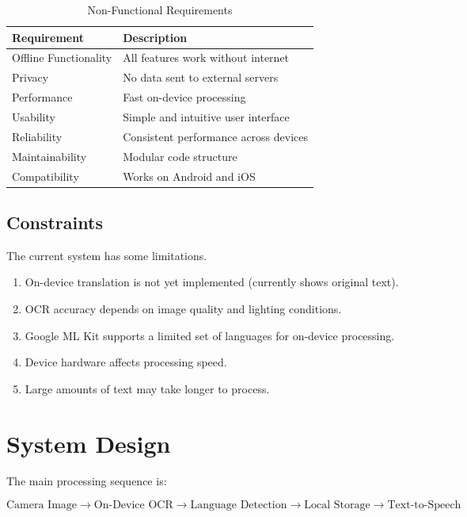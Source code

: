 \documentclass[12pt,a4paper]{report}
\begin{document}
\begin{table}[H]
\centering
\caption{Non-Functional Requirements}
\begin{tabular}{|p{4cm}|p{7cm}|}
\hline
\textbf{Requirement} & \textbf{Description} \\ \hline
Offline Functionality & All features work without internet \\ \hline
Privacy & No data sent to external servers \\ \hline
Performance & Fast on-device processing \\ \hline
Usability & Simple and intuitive user interface \\ \hline
Reliability & Consistent performance across devices \\ \hline
Maintainability & Modular code structure \\ \hline
Compatibility & Works on Android and iOS \\ \hline
\end{tabular}
\end{table}

\subsection{Constraints}

The current system has some limitations.

\begin{enumerate}
    \item On-device translation is not yet implemented (currently shows original text).
    \item OCR accuracy depends on image quality and lighting conditions.
    \item Google ML Kit supports a limited set of languages for on-device processing.
    \item Device hardware affects processing speed.
    \item Large amounts of text may take longer to process.
\end{enumerate}

\section{System Design}

The main processing sequence is:

\[
\text{Camera Image}
\rightarrow
\text{On-Device OCR}
\rightarrow
\text{Language Detection}
\rightarrow
\text{Local Storage}
\rightarrow
\text{Text-to-Speech}
\]
\end{document}
